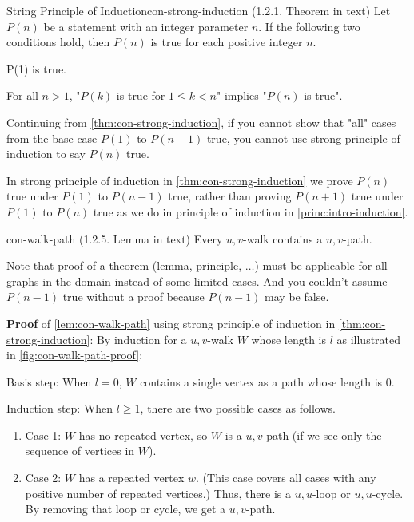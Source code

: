 \documentclass[../src/handouts/main.tex]{subfiles}
\begin{document}
\begin{theorem}{String Principle of Induction}{con-strong-induction}
  (1.2.1. Theorem in text)
  Let $P(n)$ be a statement with an integer parameter $n$.
  If the following two conditions hold, then $P(n)$ is true for each positive integer $n$.

  \begin{enumerate*}
    \item P(1) is true.
    \item For all $n > 1$, "$P(k)$ is true for $1 \leq k < n$" implies "$P(n)$ is true".
  \end{enumerate*}
\end{theorem}

Continuing from \cref{thm:con-strong-induction}, if you cannot show that "all" cases from the base case $P(1)$ to $P(n-1)$ true, you cannot use strong principle of induction to say $P(n)$ true.

In strong principle of induction in \cref{thm:con-strong-induction} we prove $P(n)$ true under $P(1)$ to $P(n - 1)$ true, rather than proving $P(n + 1)$ true under $P(1)$ to $P(n)$ true as we do in principle of induction in \cref{princ:intro-induction}.

\begin{lemma}{}{con-walk-path}
  (1.2.5. Lemma in text)
  Every $u,v$-walk contains a $u,v$-path.
\end{lemma}

Note that proof of a theorem (lemma, principle, $\ldots$) must be applicable for all graphs in the domain instead of some limited cases. And you couldn't assume $P(n - 1)$ true without a proof because $P(n - 1)$ may be false.

\textbf{Proof} of \cref{lem:con-walk-path} using strong principle of induction in \cref{thm:con-strong-induction}:
By induction for a $u,v$-walk $W$ whose length is $l$ as illustrated in \cref{fig:con-walk-path-proof}:
\begin{enumerate*}
  \item Basis step: When $l = 0$, $W$ contains a single vertex as a path whose length is 0.
  \item Induction step: When $l \geq 1$, there are two possible cases as follows.
    \begin{enumerate}
      \item Case 1: $W$ has no repeated vertex, so $W$ is a $u,v$-path (if we see only the sequence of vertices in $W$).
      \item Case 2: $W$ has a repeated vertex $w$. (This case covers all cases with any positive number of repeated vertices.) Thus, there is a $u,u$-loop or $u,u$-cycle. By removing that loop or cycle, we get a $u,v$-path.
    \end{enumerate}
\end{enumerate*}
\end{document}
